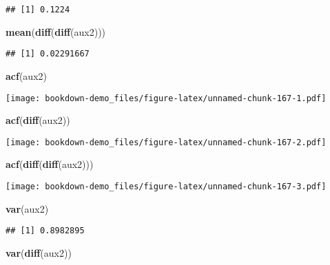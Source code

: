\documentclass[]{book}
\newenvironment{Shaded}{\begin{snugshade}}{\end{snugshade}}
\newcommand{\KeywordTok}[1]{\textcolor[rgb]{0.13,0.29,0.53}{\textbf{#1}}}
\newcommand{\NormalTok}[1]{#1}
\theoremstyle{definition}
\theoremstyle{definition}
\theoremstyle{definition}
\theoremstyle{remark}
\begin{document}
\begin{verbatim}
## [1] 0.1224
\end{verbatim}

\begin{Shaded}
\begin{Highlighting}[]
\KeywordTok{mean}\NormalTok{(}\KeywordTok{diff}\NormalTok{(}\KeywordTok{diff}\NormalTok{(aux2)))}
\end{Highlighting}
\end{Shaded}

\begin{verbatim}
## [1] 0.02291667
\end{verbatim}

\begin{Shaded}
\begin{Highlighting}[]
\KeywordTok{acf}\NormalTok{(aux2)}
\end{Highlighting}
\end{Shaded}

\texttt{[image: bookdown-demo\_files/figure-latex/unnamed-chunk-167-1.pdf]}

\begin{Shaded}
\begin{Highlighting}[]
\KeywordTok{acf}\NormalTok{(}\KeywordTok{diff}\NormalTok{(aux2))}
\end{Highlighting}
\end{Shaded}

\texttt{[image: bookdown-demo\_files/figure-latex/unnamed-chunk-167-2.pdf]}

\begin{Shaded}
\begin{Highlighting}[]
\KeywordTok{acf}\NormalTok{(}\KeywordTok{diff}\NormalTok{(}\KeywordTok{diff}\NormalTok{(aux2)))}
\end{Highlighting}
\end{Shaded}

\texttt{[image: bookdown-demo\_files/figure-latex/unnamed-chunk-167-3.pdf]}

\begin{Shaded}
\begin{Highlighting}[]
\KeywordTok{var}\NormalTok{(aux2)}
\end{Highlighting}
\end{Shaded}

\begin{verbatim}
## [1] 0.8982895
\end{verbatim}

\begin{Shaded}
\begin{Highlighting}[]
\KeywordTok{var}\NormalTok{(}\KeywordTok{diff}\NormalTok{(aux2))}
\end{Highlighting}
\end{Shaded}
\end{document}
